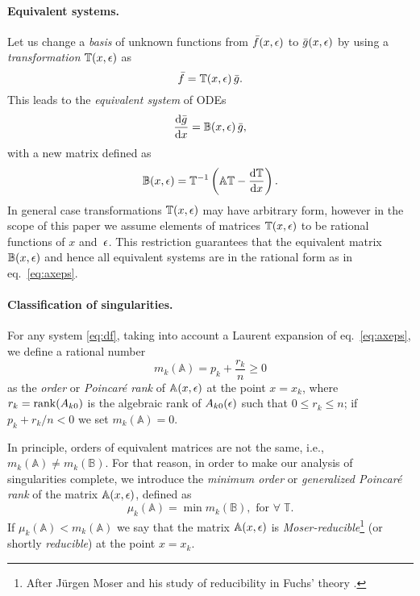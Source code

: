\documentclass[12pt,a4paper]{article}
\def\M#1{\mathbb{#1}} %
\begin{document}
\paragraph{Equivalent systems.}
Let us change a {\em basis} of unknown functions from $\bar{f}(x,\epsilon)$ to $\bar{g}(x,\epsilon)$ by using a {\em transformation} $\M T(x,\eps)$ as
\begin{equation}
\label{eq:gtf}
  \bar{f} = \M T(x,\eps)\, \bar{g}.
\end{equation}
This leads to the {\em equivalent system} of ODEs
\begin{equation}
  \frac{\D \bar{g}}{\D x} = \M B(x,\eps)\,\bar{g},
\end{equation}
with a new matrix defined as
\begin{equation}
\label{eq:bta}
  \M B(x,\eps) = \M T^{-1} \left( \M A \M T - \frac{\D \M T}{\D x} \right).
\end{equation}
In general case transformations $\M T(x,\eps)$ may have arbitrary form, however in the scope of this paper we assume elements of matrices $\M T(x,\eps)$ to be rational functions of $x$ and~$\epsilon$.
This restriction guarantees that the equivalent matrix $\M B(x,\eps)$ and hence all equivalent systems are in the rational form as in eq.~\eqref{eq:axeps}.

\paragraph{Classification of singularities.}
For any system \eqref{eq:df}, taking into account a Laurent expansion of eq.~\eqref{eq:axeps}, we define a rational number
\begin{equation}
\label{eq:mk}
  m_k(\M A) = p_k + \frac{r_k}{n} \ge 0
\end{equation}
as the {\em order} or {\em Poincar\'e rank} of $\M A(x,\eps)$ at the point $x=x_k$, where $r_k = \mathrm{rank}(A_{k0})$ is the algebraic rank of $A_{k0}(\epsilon)$ such that $0 \le r_k \le n$; if $p_k + r_k/n < 0$ we set $m_k(\M A) = 0$.

In principle, orders of equivalent matrices are not the same, i.e., $m_k(\M A) \ne m_k(\M B)$.
For that reason, in order to make our analysis of singularities complete, we introduce the {\em minimum order} or {\em generalized Poincar\'e rank} of the matrix $\M A(x,\eps)$, defined as
\begin{equation}
\label{eq:muk}
  \mu_k(\M A) = \min m_k(\M B), \text{ for } \forall \; \M T.
\end{equation}
If $\mu_k(\M A) < m_k(\M A)$ we say that the matrix $\M A(x,\eps)$ is {\em Moser-reducible}\footnote{After J\"urgen Moser and his study of reducibility in Fuchs' theory \cite{Mos59}.} (or shortly {\em reducible}) at the point $x=x_k$.
\end{document}
